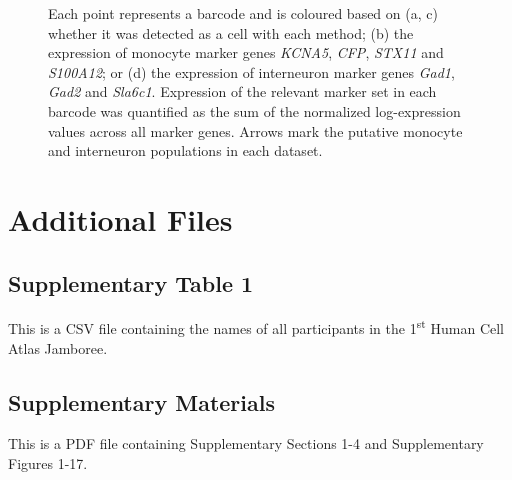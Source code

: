 \documentclass{bmcart}
\begin{document}
\begin{figure}[h!]
\caption{
Each point represents a barcode and is coloured based on (a, c) whether it was detected as a cell with each method;
(b) the expression of monocyte marker genes \textit{KCNA5}, \textit{CFP}, \textit{STX11} and \textit{S100A12};
or (d) the expression of interneuron marker genes \textit{Gad1}, \textit{Gad2} and \textit{Sla6c1}.
Expression of the relevant marker set in each barcode was quantified as the sum of the normalized log-expression values across all marker genes.
Arrows mark the putative monocyte and interneuron populations in each dataset.
}
\label{fig:realtsne}
\end{figure}



\section*{Additional Files}
\subsection*{Supplementary Table 1}
This is a CSV file containing the names of all participants in the 1\textsuperscript{st} Human Cell Atlas Jamboree.

\subsection*{Supplementary Materials}
This is a PDF file containing Supplementary Sections 1-4 and Supplementary Figures 1-17.
\end{document}
